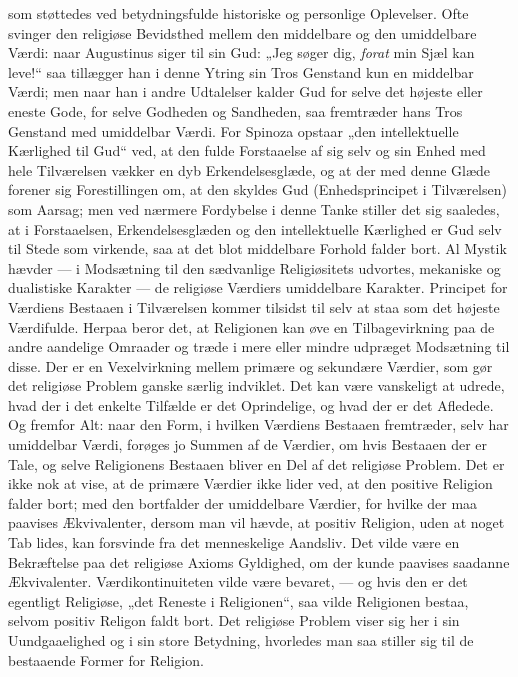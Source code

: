 \documentclass[12pt,a4paper,openany]{book}
\newcommand{\opage}[1]{\marginnote{\footnotesize\textit{[#1]}}}
\begin{document}
som støttedes ved betydningsfulde historiske og personlige Oplevelser.
Ofte svinger den religiøse Bevidsthed mellem den middelbare og den
umiddelbare Værdi: naar Augustinus siger til sin Gud: „Jeg søger dig,
\textit{forat} min Sjæl kan leve!“ saa tillægger han i denne Ytring sin
Tros Genstand kun en middelbar Værdi; men naar han i andre Udtalelser
kalder Gud for selve det højeste eller eneste Gode, for selve Godheden
og Sandheden, saa fremtræder hans Tros Genstand med umiddelbar Værdi.
For Spinoza opstaar „den intellektuelle Kærlighed til Gud“ ved, at den
fulde Forstaaelse af sig selv og sin Enhed med hele Tilværelsen
\opage{149}vækker en dyb Erkendelsesglæde, og at der med denne Glæde
forener sig Forestillingen om, at den skyldes Gud (Enhedsprincipet i
Tilværelsen) som Aarsag; men ved nærmere Fordybelse i denne Tanke
stiller det sig saaledes, at i Forstaaelsen, Erkendelsesglæden og den
intellektuelle Kærlighed er Gud selv til Stede som virkende, saa at det
blot middelbare Forhold falder bort. Al Mystik hævder --- i Modsætning
til den sædvanlige Religiøsitets udvortes, mekaniske og dualistiske
Karakter --- de religiøse Værdiers umiddelbare Karakter. Principet for
Værdiens Bestaaen i Tilværelsen kommer tilsidst til selv at staa som det
højeste Værdifulde. Herpaa beror det, at Religionen kan øve en
Tilbagevirkning paa de andre aandelige Omraader og træde i mere eller
mindre udpræget Modsætning til disse. Der er en Vexelvirkning mellem
primære og sekundære Værdier, som gør det religiøse Problem ganske
særlig indviklet. Det kan være vanskeligt at udrede, hvad der i det
enkelte Tilfælde er det Oprindelige, og hvad der er det Afledede. Og
fremfor Alt: naar den Form, i hvilken Værdiens Bestaaen fremtræder, selv
har umiddelbar Værdi, forøges jo Summen af de Værdier, om hvis Bestaaen
der er Tale, og selve Religionens Bestaaen bliver en Del af det
religiøse Problem. Det er ikke nok at vise, at de primære Værdier ikke
lider ved, at den positive Religion falder bort; med den bortfalder der
umiddelbare Værdier, for hvilke der maa paavises Ækvivalenter, dersom
man vil hævde, at positiv Religion, uden at noget Tab lides, kan
forsvinde fra det menneskelige Aandsliv. Det vilde være en Bekræftelse
paa det religiøse Axioms Gyldighed, om der kunde paavises saadanne
Ækvivalenter. Værdikontinuiteten vilde være bevaret, --- og hvis den er
det egentligt Religiøse, „det Reneste i Religionen“, saa vilde
Religionen bestaa, selvom positiv Religon faldt bort. Det religiøse
Problem viser sig her i sin Uundgaaelighed og i sin store Betydning,
hvorledes man saa stiller sig til de bestaaende Former for Religion.
\end{document}
